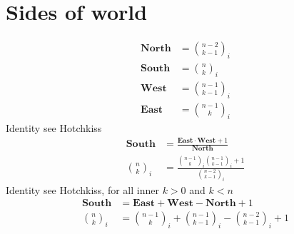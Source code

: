 \documentclass[12pt,letterpaper,oneside,reqno]{amsart}
\newcommand \rascalNumber [3] {\binom{#1}{#2}_{#3}}
\newcommand \north[0] {\mathbf{North}}
\newcommand \south[0] {\mathbf{South}}
\newcommand \west[0] {\mathbf{West}}
\newcommand \east[0] {\mathbf{East}}
\numberwithin{equation}{section}
\begin{document}
\section{Sides of world}
\begin{align*}
    \north &= \rascalNumber{n-2}{k-1}{i} \\
    \south &= \rascalNumber{n}{k}{i} \\
    \west  &= \rascalNumber{n-1}{k-1}{i} \\
    \east  &= \rascalNumber{n-1}{k}{i}
\end{align*}
Identity see Hotchkiss
\begin{align}
    \south                  &= \frac{\east \cdot \west + 1}{\north} \\
    \rascalNumber{n}{k}{i}  &= \frac{\rascalNumber{n-1}{k}{i} \rascalNumber{n-1}{k-1}{i} +1}{\rascalNumber{n-2}{k-1}{i}}
\end{align}
Identity see Hotchkiss, for all inner $k > 0$ and $k < n$
\begin{align}
    \south                 &= \east + \west - \north  + 1 \\
    \rascalNumber{n}{k}{i} &= \rascalNumber{n-1}{k}{i} + \rascalNumber{n-1}{k-1}{i} - \rascalNumber{n-2}{k-1}{i} + 1
\end{align}
\end{document}
